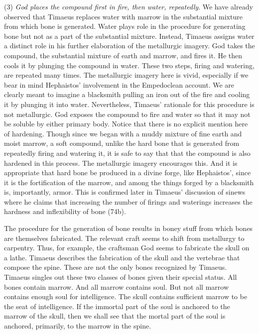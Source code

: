 (3) \emph{God places the compound first in fire, then water, repeatedly}. We have already observed that Timaeus replaces water with marrow in the substantial mixture from which bone is generated. Water plays role in the procedure for generating bone but not as a part of the substantial mixture. Instead, Timaeus assigns water a distinct role in his further elaboration of the metallurgic imagery. God takes the compound, the substantial mixture of earth and marrow, and fires it. He then cools it by plunging the compound in water. These two steps, firing and watering, are repeated many times. The metallurgic imagery here is vivid, especially if we bear in mind Hephaistos' involvement in the Empedoclean account. We are clearly meant to imagine a blacksmith pulling an iron out of the fire and cooling it by plunging it into water. Nevertheless, Timaeus' rationale for this procedure is not metallurgic. God exposes the compound to fire and water so that it may not be soluble by either primary body. Notice that there is no explicit mention here of hardening. Though since we began with a muddy mixture of fine earth and moist marrow, a soft compound, unlike the hard bone that is generated from repeatedly firing and watering it, it is safe to say that that the compound is also hardened in this process. The metallurgic imagery encourages this. And it is appropriate that hard bone be produced in a divine forge, like Hephaistos', since it is the fortification of the marrow, and among the things forged by a blacksmith is, importantly, armor. This is confirmed later in Timaeus' discussion of sinews where he claims that increasing the number of firings and waterings increases the hardness and inflexibility of bone (74b).

The procedure for the generation of bone results in boney stuff from which bones are themselves fabricated. The relevant craft seems to shift from metallurgy to carpentry. Thus, for example, the craftsman God seems to fabricate the skull on a lathe. Timaeus describes the fabrication of the skull and the vertebrae that compose the spine. These are not the only bones recognized by Timaeus. Timaeus singles out these two classes of bones given their special status. All bones contain marrow. And all marrow contains soul. But not all marrow contains enough soul for intelligence. The skull contains sufficient marrow to be the seat of intelligence. If the immortal part of the soul is anchored to the marrow of the skull, then we shall see that the mortal part of the soul is anchored, primarily, to the marrow in the spine.


